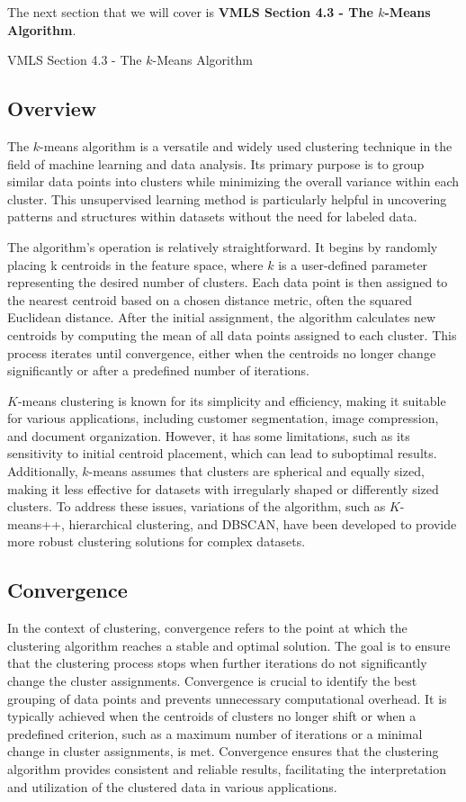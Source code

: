The next section that we will cover is \textbf{VMLS Section 4.3 - The $k$-Means Algorithm}.

\begin{notes}{VMLS Section 4.3 - The $k$-Means Algorithm}
    \subsection*{Overview}

    The $k$-means algorithm is a versatile and widely used clustering technique in the field of machine learning and data analysis. Its primary purpose is to group similar data points into clusters while minimizing 
    the overall variance within each cluster. This unsupervised learning method is particularly helpful in uncovering patterns and structures within datasets without the need for labeled data.

    The algorithm's operation is relatively straightforward. It begins by randomly placing k centroids in the feature space, where $k$ is a user-defined parameter representing the desired number of clusters. Each data 
    point is then assigned to the nearest centroid based on a chosen distance metric, often the squared Euclidean distance. After the initial assignment, the algorithm calculates new centroids by computing the mean 
    of all data points assigned to each cluster. This process iterates until convergence, either when the centroids no longer change significantly or after a predefined number of iterations.

    $K$-means clustering is known for its simplicity and efficiency, making it suitable for various applications, including customer segmentation, image compression, and document organization. However, it has some 
    limitations, such as its sensitivity to initial centroid placement, which can lead to suboptimal results. Additionally, $k$-means assumes that clusters are spherical and equally sized, making it less effective for 
    datasets with irregularly shaped or differently sized clusters. To address these issues, variations of the algorithm, such as $K$-means++, hierarchical clustering, and DBSCAN, have been developed to provide more 
    robust clustering solutions for complex datasets.

    \subsection*{Convergence}
    In the context of clustering, convergence refers to the point at which the clustering algorithm reaches a stable and optimal solution. The goal is to ensure that the clustering process stops when further iterations 
    do not significantly change the cluster assignments. Convergence is crucial to identify the best grouping of data points and prevents unnecessary computational overhead. It is typically achieved when the centroids 
    of clusters no longer shift or when a predefined criterion, such as a maximum number of iterations or a minimal change in cluster assignments, is met. Convergence ensures that the clustering algorithm provides 
    consistent and reliable results, facilitating the interpretation and utilization of the clustered data in various applications.
\end{notes}

